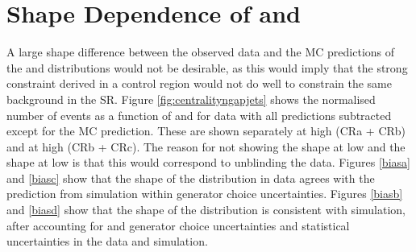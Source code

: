 \section{Shape Dependence of \Ngapjet and \xily}

A large shape difference between the observed data and the MC predictions of the \xily and \ngapjets distributions would not be desirable, as this would imply that the strong constraint derived in a control region would not do well to constrain the same background in the SR. Figure \ref{fig:centralityngapjets} shows the normalised number of events as a function of \ngapjets and \xily for data with all predictions subtracted except for the \qcdwy MC prediction. These are shown separately at high \ngapjets (CRa + CRb) and at high \lyxi (CRb + CRc). The reason for not showing the \ngapjets shape at low \lyxi and the \lyxi shape at low \ngapjets is that this would correspond to unblinding the data. Figures \ref{biasa} and \ref{biasc} show that the shape of the \ngapjets distribution in data agrees with the prediction from simulation within \qcdwy generator choice uncertainties. Figures \ref{biasb} and \ref{biasd} show that the shape of the \xily distribution is consistent with simulation, after accounting for \qcdwy and \ewwy generator choice uncertainties and statistical uncertainties in the data and simulation.


